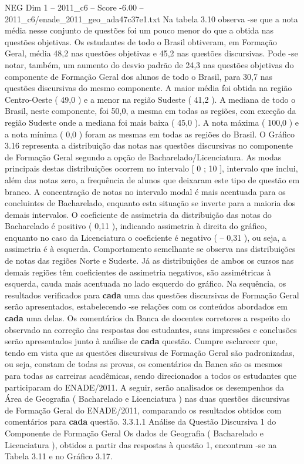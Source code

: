 \begin{textsample}{NEG Dim 1 – 2011\_c6 – Score -6.00 – 2011\_c6/enade\_2011\_geo\_ada47c37e1.txt}
Na tabela 3.10 observa -se que a nota média nesse conjunto de questões foi um pouco menor do que a obtida nas questões objetivas.
Os estudantes de todo o Brasil obtiveram, em Formação Geral, média 48,2 nas questões objetivas e 45,2 nas questões discursivas.
Pode -se notar, também, um aumento do desvio padrão de 24,3 nas questões objetivas do componente de Formação Geral dos alunos de todo o Brasil, para 30,7 nas questões discursivas do mesmo componente.
A maior média foi obtida na região Centro-Oeste ( 49,0 ) e a menor na região Sudeste ( 41,2 ).
A mediana de todo o Brasil, neste componente, foi 50,0, a mesma em todas as regiões, com exceção da região Sudeste onde a mediana foi mais baixa ( 45,0 ).
A nota máxima ( 100,0 ) e a nota mínima ( 0,0 ) foram as mesmas em todas as regiões do Brasil.
O Gráfico 3.16 representa a distribuição das notas nas questões discursivas no componente de Formação Geral segundo a opção de Bacharelado/Licenciatura.
As modas principais destas distribuições ocorrem no intervalo [ 0 ; 10 ], intervalo que inclui, além das notas zero, a frequência de alunos que deixaram este tipo de questão em branco.
A concentração de notas no intervalo modal é mais acentuada para os concluintes de Bacharelado, enquanto esta situação se inverte para a maioria dos demais intervalos.
O coeficiente de assimetria da distribuição das notas do Bacharelado é positivo ( 0,11 ), indicando assimetria à direita do gráfico, enquanto no caso da Licenciatura o coeficiente é negativo ( – 0,31 ), ou seja, a assimetria é à esquerda.
Comportamento semelhante se observa nas distribuições de notas das regiões Norte e Sudeste.
Já as distribuições de ambos os cursos nas demais regiões têm coeficientes de assimetria negativos, são assimétricas à esquerda, cauda mais acentuada no lado esquerdo do gráfico.
Na sequência, os resultados verificados para \textbf{cada} uma das questões discursivas de Formação Geral serão apresentados, estabelecendo -se relações com os conteúdos abordados em \textbf{cada} uma delas.
Os comentários da Banca de docentes corretores a respeito do observado na correção das respostas dos estudantes, suas impressões e conclusões serão apresentados junto à análise de \textbf{cada} questão.
Cumpre esclarecer que, tendo em vista que as questões discursivas de Formação Geral são padronizadas, ou seja, constam de todas as provas, os comentários da Banca são os mesmos para todas as carreiras acadêmicas, sendo direcionados a todos os estudantes que participaram do ENADE/2011.
A seguir, serão analisados os desempenhos da Área de Geografia ( Bacharelado e Licenciatura ) nas duas questões discursivas de Formação Geral do ENADE/2011, comparando os resultados obtidos com comentários para \textbf{cada} questão. 3.3.1.1 Análise da Questão Discursiva 1 do Componente de Formação Geral Os dados de Geografia ( Bacharelado e Licenciatura ), obtidos a partir das respostas à questão 1, encontram -se na Tabela 3.11 e no Gráfico 3.17.

\end{textsample}
